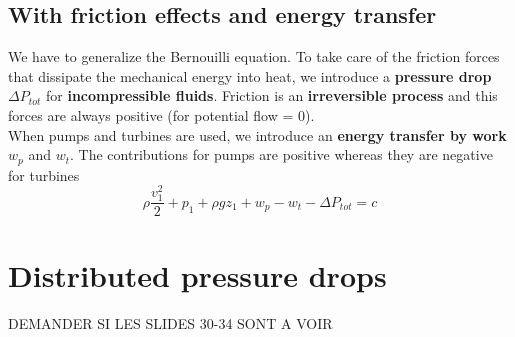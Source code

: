 			\subsection{With friction effects and energy transfer}
				We have to generalize the Bernouilli equation. To take care of the friction forces that dissipate the mechanical energy into heat, we introduce a \textbf{pressure drop} $\Delta P_{tot}$ for \textbf{incompressible fluids}. Friction is an \textbf{irreversible process} and this forces are always positive (for potential flow = 0). \\
				When pumps and turbines are used, we introduce an \textbf{energy transfer by work} $w_p$ and $w_t$. The contributions for pumps are positive whereas they are negative for turbines 
				\begin{equation}
					\rho \frac{v_1^2}{2} + p_1 + \rho gz_1 + w_p -w_t - \Delta P_{tot} = c
				\end{equation}
				
\section{Distributed pressure drops}
	DEMANDER SI LES SLIDES 30-34 SONT A VOIR

